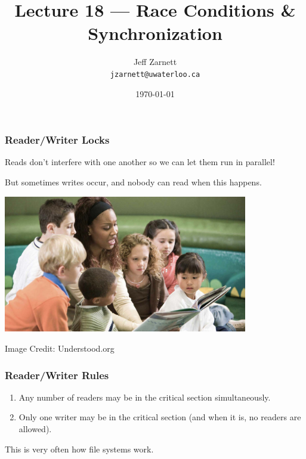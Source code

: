 
\usepackage{multirow}

\title{Lecture 18 --- Race Conditions \& Synchronization }

\author{Jeff Zarnett \\ \small \texttt{jzarnett@uwaterloo.ca}}
\date{\today}




\begin{frame}
	\titlepage

\end{frame}

\begin{frame}
	\frametitle{Reader/Writer Locks}
	Reads don't interfere with one another so we can let them run in parallel!

	But sometimes writes occur, and nobody can read when this happens.

	\begin{center}
		\includegraphics[width=0.8\textwidth]{images/groupreading.jpg}
	\end{center}
	\hfill Image Credit: Understood.org
\end{frame}

\begin{frame}
	\frametitle{Reader/Writer Rules}


	\begin{enumerate}
		\item Any number of readers may be in the critical section simultaneously.
		\item Only one writer may be in the critical section (and when it is, no readers are allowed).
	\end{enumerate}


	This is very often how file systems work.

\end{frame}


